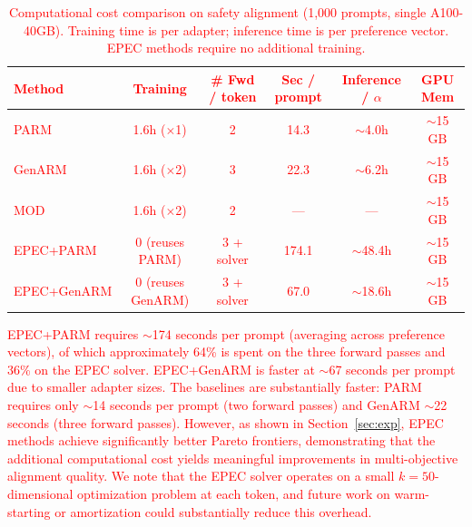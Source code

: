 \documentclass{article}
\begin{document}
\begin{table}[h]
\centering
\caption{\textcolor{red}{Computational cost comparison on safety alignment (1{,}000 prompts, single A100-40GB). Training time is per adapter; inference time is per preference vector. EPEC methods require no additional training.}}
\vspace{3pt}
\small
\textcolor{red}{
\begin{tabular}{lccccc}
\toprule
\textbf{Method} & \textbf{Training} & \textbf{\# Fwd / token} & \textbf{Sec / prompt} & \textbf{Inference / $\alpha$} & \textbf{GPU Mem} \\
\midrule
PARM         & 1.6h ($\times$1) & 2 & 14.3 & $\sim$4.0h  & $\sim$15 GB \\
GenARM       & 1.6h ($\times$2) & 3 & 22.3 & $\sim$6.2h  & $\sim$15 GB \\
MOD          & 1.6h ($\times$2) & 2 & ---  & ---         & $\sim$15 GB \\
EPEC+PARM    & 0 (reuses PARM) & 3 + solver & 174.1 & $\sim$48.4h & $\sim$15 GB \\
EPEC+GenARM  & 0 (reuses GenARM) & 3 + solver & 67.0  & $\sim$18.6h & $\sim$15 GB \\
\bottomrule
\end{tabular}
}
\label{tab:cost}
\vspace{-5pt}
\end{table}

\textcolor{red}{EPEC+PARM requires $\sim$174 seconds per prompt (averaging across preference vectors), of which approximately 64\% is spent on the three forward passes and 36\% on the EPEC solver. EPEC+GenARM is faster at $\sim$67 seconds per prompt due to smaller adapter sizes. The baselines are substantially faster: PARM requires only $\sim$14 seconds per prompt (two forward passes) and GenARM $\sim$22 seconds (three forward passes). However, as shown in Section~\ref{sec:exp}, EPEC methods achieve significantly better Pareto frontiers, demonstrating that the additional computational cost yields meaningful improvements in multi-objective alignment quality. We note that the EPEC solver operates on a small $k{=}50$-dimensional optimization problem at each token, and future work on warm-starting or amortization could substantially reduce this overhead.}
\end{document}
